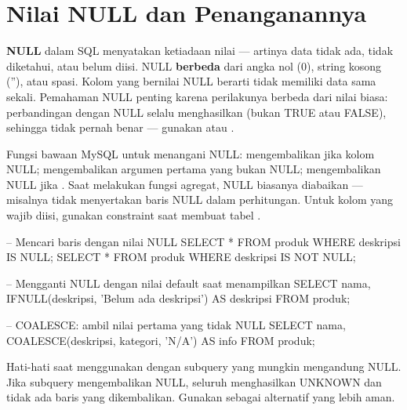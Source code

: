 \section{Nilai NULL dan Penanganannya}

\textbf{NULL} dalam SQL menyatakan ketiadaan nilai --- artinya data tidak ada, tidak diketahui, atau belum diisi. NULL \textbf{berbeda} dari angka nol (0), string kosong (''), atau spasi. Kolom yang bernilai NULL berarti tidak memiliki data sama sekali. Pemahaman NULL penting karena perilakunya berbeda dari nilai biasa: perbandingan dengan NULL selalu menghasilkan  (bukan TRUE atau FALSE), sehingga  tidak pernah benar --- gunakan  atau  \cite{mysqlDocs}.

Fungsi bawaan MySQL untuk menangani NULL:  mengembalikan  jika kolom NULL;  mengembalikan argumen pertama yang bukan NULL;  mengembalikan NULL jika . Saat melakukan fungsi agregat, NULL biasanya diabaikan --- misalnya  tidak menyertakan baris NULL dalam perhitungan. Untuk kolom yang wajib diisi, gunakan constraint  saat membuat tabel \cite{mysqlGettingStarted}.

\begin{webcode}[language=SQL, caption={Penanganan nilai NULL}]
-- Mencari baris dengan nilai NULL
SELECT * FROM produk WHERE deskripsi IS NULL;
SELECT * FROM produk WHERE deskripsi IS NOT NULL;

-- Mengganti NULL dengan nilai default saat menampilkan
SELECT nama, IFNULL(deskripsi, 'Belum ada deskripsi') AS deskripsi
FROM produk;

-- COALESCE: ambil nilai pertama yang tidak NULL
SELECT nama, COALESCE(deskripsi, kategori, 'N/A') AS info
FROM produk;
\end{webcode}

\begin{catatan}
Hati-hati saat menggunakan  dengan subquery yang mungkin mengandung NULL. Jika subquery mengembalikan NULL, seluruh  menghasilkan UNKNOWN dan tidak ada baris yang dikembalikan. Gunakan  sebagai alternatif yang lebih aman.
\end{catatan}

